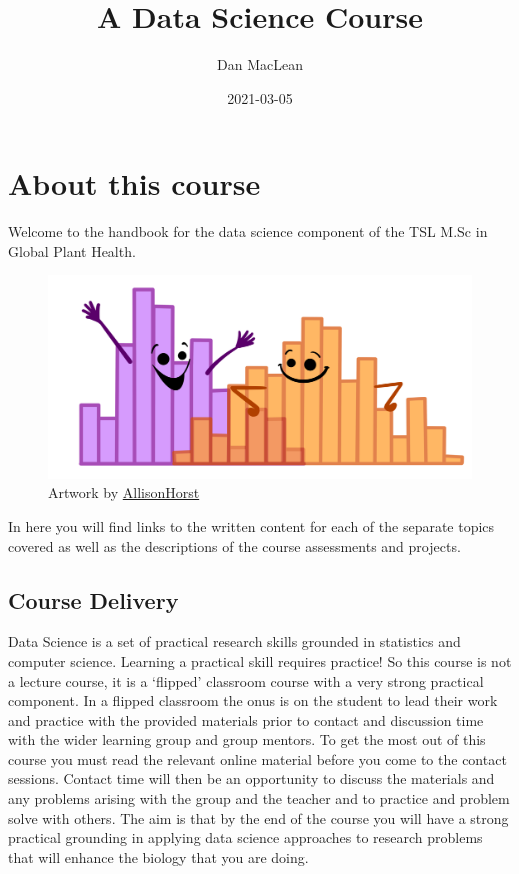 \documentclass[
]{book}
\title{A Data Science Course}
\author{Dan MacLean}
\date{2021-03-05}
\begin{document}
\maketitle

{
\setcounter{tocdepth}{1}
\tableofcontents
}
\hypertarget{about-this-course}{%
\chapter{About this course}\label{about-this-course}}

Welcome to the handbook for the data science component of the TSL M.Sc in Global Plant Health.

\begin{figure}
\centering
\includegraphics{ex_1.png}
\caption{\label{fig:unnamed-chunk-1}Artwork by \href{https://github.com/allisonhorst}{AllisonHorst}}
\end{figure}

In here you will find links to the written content for each of the separate topics covered as well as the descriptions of the course assessments and projects.

\hypertarget{course-delivery}{%
\section{Course Delivery}\label{course-delivery}}

Data Science is a set of practical research skills grounded in statistics and computer science. Learning a practical skill requires practice! So this course is not a lecture course, it is a `flipped' classroom course with a very strong practical component. In a flipped classroom the onus is on the student to lead their work and practice with the provided materials prior to contact and discussion time with the wider learning group and group mentors. To get the most out of this course you must read the relevant online material before you come to the contact sessions. Contact time will then be an opportunity to discuss the materials and any problems arising with the group and the teacher and to practice and problem solve with others. The aim is that by the end of the course you will have a strong practical grounding in applying data science approaches to research problems that will enhance the biology that you are doing.
\end{document}

